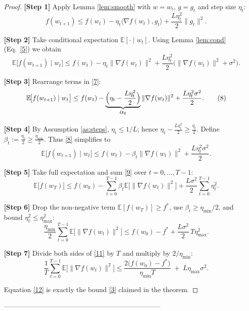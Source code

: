 \documentclass{article}
\newcommand{\EE}{\mathbb{E}}
\begin{document}
\begin{proof}
\noindent\textbf{[Step 1]} Apply Lemma \ref{lem:smooth} with $w=w_{t}$,
$g=g_{t}$ and step size $\eta_{t}$:
\[
f(w_{t+1})\le f(w_{t})-\eta_{t}\langle\nabla f(w_{t}),g_{t}\rangle
            +\frac{L\eta_{t}^{2}}{2}\|g_{t}\|^{2}.
\tag{6}
\]

\noindent\textbf{[Step 2]} Take conditional expectation $\EE[\cdot\mid w_{t}]$.
Using Lemma \ref{lem:cond} (Eq.~\eqref{5}) we obtain
\[
\EE\!\big[f(w_{t+1})\mid w_{t}\big]
\le f(w_{t})-\eta_{t}\|\nabla f(w_{t})\|^{2}
   +\frac{L\eta_{t}^{2}}{2}\bigl(\|\nabla f(w_{t})\|^{2}+\sigma^{2}\bigr).
\tag{7}
\]

\noindent\textbf{[Step 3]} Rearrange terms in \eqref{7}:
\[
\EE\!\big[f(w_{t+1})\mid w_{t}\big]
\le f(w_{t})
-\underbrace{\Bigl(\eta_{t}-\frac{L\eta_{t}^{2}}{2}\Bigr)}_{\displaystyle
\alpha_{t}}\|\nabla f(w_{t})\|^{2}
+\frac{L\eta_{t}^{2}\sigma^{2}}{2}.
\tag{8}
\]

\noindent\textbf{[Step 4]} By Assumption \ref{as:steps}, $\eta_{t}\le 1/L$;
hence $\eta_{t}-\frac{L\eta_{t}^{2}}{2}\ge \frac{\eta_{t}}{2}$.  Define
$\displaystyle \beta_{t}:=\frac{\eta_{t}}{2}\ge\frac{\eta_{\min}}{2}$.
Thus \eqref{8} simplifies to
\[
\EE\!\big[f(w_{t+1})\mid w_{t}\big]
\le f(w_{t})-\beta_{t}\|\nabla f(w_{t})\|^{2}
    +\frac{L\eta_{t}^{2}\sigma^{2}}{2}.
\tag{9}
\]

\noindent\textbf{[Step 5]} Take full expectation and sum \eqref{9} over
$t=0,\dots ,T-1$:
\[
\EE\big[f(w_{T})\big]
\le f(w_{0})
-\sum_{t=0}^{T-1}\beta_{t}\EE\!\big[\|\nabla f(w_{t})\|^{2}\big]
+\frac{L\sigma^{2}}{2}\sum_{t=0}^{T-1}\eta_{t}^{2}.
\tag{10}
\]

\noindent\textbf{[Step 6]} Drop the non‑negative term $\EE[f(w_{T})]\ge f^{*}$,
use $\beta_{t}\ge\eta_{\min}/2$, and bound $\eta_{t}^{2}\le\eta_{\max}^{2}$:
\[
\frac{\eta_{\min}}{2}\sum_{t=0}^{T-1}\EE\!\big[\|\nabla f(w_{t})\|^{2}\big]
\le f(w_{0})-f^{*}
    +\frac{L\sigma^{2}}{2}\,T\eta_{\max}^{2}.
\tag{11}
\]

\noindent\textbf{[Step 7]} Divide both sides of \eqref{11} by $T$ and
multiply by $2/\eta_{\min}$:
\[
\frac{1}{T}\sum_{t=0}^{T-1}\EE\!\big[\|\nabla f(w_{t})\|^{2}\big]
\le
\frac{2\big(f(w_{0})-f^{*}\big)}{\eta_{\min}T}
\;+\;
L\eta_{\max}\sigma^{2}.
\tag{12}
\]

Equation \eqref{12} is exactly the bound \eqref{3} claimed in the theorem.
\end{proof}

---------------------------------------------------------------------
\end{document}

